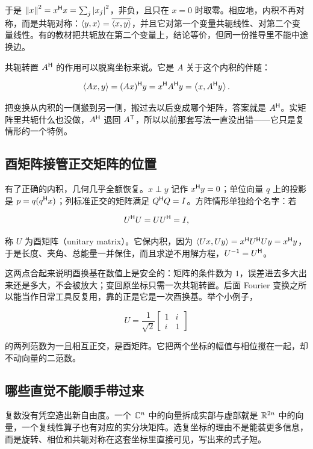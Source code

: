 于是 \(\left\lVert x\right\rVert^2=x^{\mathsf{H}}x=\sum_j\left|x_j\right|^2\)，非负，且只在 \(x=0\) 时取零。相应地，内积不再对称，而是共轭对称：\(\left\langle y,x\right\rangle=\overline{\left\langle x,y\right\rangle}\)，并且它对第一个变量共轭线性、对第二个变量线性。有的教材把共轭放在第二个变量上，结论等价，但同一份推导里不能中途换边。

共轭转置 \(A^{\mathsf{H}}\) 的作用可以脱离坐标来说。它是 \(A\) 关于这个内积的伴随：

\[
\left\langle Ax,y\right\rangle=(Ax)^{\mathsf{H}}y=x^{\mathsf{H}}A^{\mathsf{H}}y=\left\langle x,A^{\mathsf{H}}y\right\rangle.
\]

把变换从内积的一侧搬到另一侧，搬过去以后变成哪个矩阵，答案就是 \(A^{\mathsf{H}}\)。实矩阵里共轭什么也没做，\(A^{\mathsf{H}}\) 退回 \(A^{\mathsf{T}}\)，所以以前那套写法一直没出错——它只是复情形的一个特例。

\subsection{酉矩阵接管正交矩阵的位置}

有了正确的内积，几何几乎全额恢复。\(x\perp y\) 记作 \(x^{\mathsf{H}}y=0\)；单位向量 \(q\) 上的投影是 \(p=q(q^{\mathsf{H}}x)\)；列标准正交的矩阵满足 \(Q^{\mathsf{H}}Q=I\)。方阵情形单独给个名字：若

\[
U^{\mathsf{H}}U=UU^{\mathsf{H}}=I,
\]

称 \(U\) 为酉矩阵（unitary matrix）。它保内积，因为 \(\left\langle Ux,Uy\right\rangle=x^{\mathsf{H}}U^{\mathsf{H}}Uy=x^{\mathsf{H}}y\)，于是长度、夹角、总能量一并保住，而且求逆不用解方程，\(U^{-1}=U^{\mathsf{H}}\)。

这两点合起来说明酉换基在数值上是安全的：矩阵的条件数为 \(1\)，误差进去多大出来还是多大，不会被放大；变回原坐标只需一次共轭转置。后面 Fourier 变换之所以能当作日常工具反复用，靠的正是它是一次酉换基。举个小例子，

\[
U=\frac1{\sqrt2}\begin{bmatrix}1&i\\i&1\end{bmatrix}
\]

的两列范数为一且相互正交，是酉矩阵。它把两个坐标的幅值与相位搅在一起，却不动向量的二范数。

\subsection{哪些直觉不能顺手带过来}

复数没有凭空造出新自由度。一个 \(\mathbb{C}^n\) 中的向量拆成实部与虚部就是 \(\mathbb{R}^{2n}\) 中的向量，一个复线性算子也有对应的实分块矩阵。选复坐标的理由不是能装更多信息，而是旋转、相位和共轭对称在这套坐标里直接可见，写出来的式子短。

